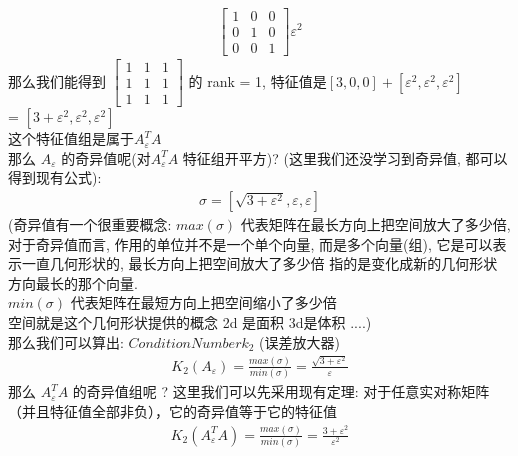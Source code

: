 \documentclass[12pt]{article}
\begin{document}
\begin{flushleft}
\begin{align}
\begin{bmatrix}
                                            1 & 0 & 0 \\
                                            0 & 1 & 0 \\
                                            0 & 0 & 1
                                        \end{bmatrix}\varepsilon^{2}
    \end{align}
    那么我们能得到 $\begin{bmatrix}
            1 & 1 & 1 \\
            1 & 1 & 1 \\
            1 & 1 & 1
        \end{bmatrix}$ 的 rank = 1, 特征值是$[3, 0, 0] + [\varepsilon^{2},\varepsilon^{2},\varepsilon^{2}]$ \\
    = $[3 + \varepsilon^{2}, \varepsilon^{2}, \varepsilon^{2}]$ \\
    这个特征值组是属于$A_{\varepsilon}^{T}A$ \\
    那么 $A_{\varepsilon}$ 的奇异值呢(对$A_{\varepsilon}^{T}A$ 特征组开平方)? (这里我们还没学习到奇异值, 都可以得到现有公式):\\
    \begin{align}
        \sigma = [\sqrt{3 + \varepsilon^{2}}, \varepsilon, \varepsilon]
    \end{align}
    (奇异值有一个很重要概念: $max(\sigma)$ 代表矩阵在最长方向上把空间放大了多少倍, 对于奇异值而言, 作用的单位并不是一个单个向量,
    而是多个向量(组), 它是可以表示一直几何形状的, 最长方向上把空间放大了多少倍 指的是变化成新的几何形状 方向最长的那个向量. \\
    $min(\sigma)$  代表矩阵在最短方向上把空间缩小了多少倍 \\
    空间就是这个几何形状提供的概念  2d 是面积 3d是体积 ....) \\
    那么我们可以算出: $Condition Number k_{2}$ (误差放大器)\\
    \begin{align}
        K_{2}(A_{\varepsilon}) = \frac{max(\sigma)}{min(\sigma)} = \frac{\sqrt{3 + \varepsilon^{2}}}{\varepsilon}
    \end{align}
    那么 $A_{\varepsilon}^{T}A$ 的奇异值组呢 ?
    这里我们可以先采用现有定理: 对于任意实对称矩阵（并且特征值全部非负），它的奇异值等于它的特征值 \\
    \begin{align}
        K_{2}(A_{\varepsilon}^{T}A) = \frac{max(\sigma)}{min(\sigma)} = \frac{3 + \varepsilon^{2}}{\varepsilon^{2}}
    \end{align}


\end{flushleft}
\end{document}

